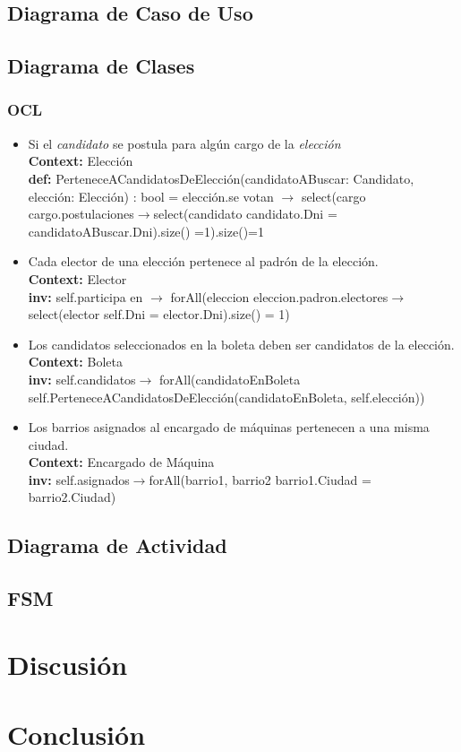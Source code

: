 \documentclass[spanish, 10pt,a4paper]{article}
\numberwithin{equation}{section} %
\begin{document}
\subsection{Diagrama de Caso de Uso}

\subsection{Diagrama de Clases}
\subsubsection{OCL}
\begin{itemize}
	\item Si el \textit{candidato} se postula para algún cargo de la \textit{elección}
\\	\textbf{Context: }  Elección
\\	\textbf{def: }PerteneceACandidatosDeElección(candidatoABuscar: Candidato, elección: Elección) : bool = elección.se votan $\rightarrow$ select(cargo \textbar cargo.postulaciones$\rightarrow$select(candidato \textbar candidato.Dni = candidatoABuscar.Dni).size() =1).size()=1

	\item Cada elector de una elección pertenece al padrón de la elección.
\\	\textbf{Context: }  Elector
\\	\textbf{inv: }self.participa en $\rightarrow$ forAll(eleccion \textbar eleccion.padron.electores$\rightarrow$select(elector \textbar self.Dni = elector.Dni).size() = 1)

	\item Los candidatos seleccionados en la boleta deben ser candidatos de la elección.
\\	\textbf{Context: }  Boleta
\\	\textbf{inv: }self.candidatos$\rightarrow$ forAll(candidatoEnBoleta \textbar self.PerteneceACandidatosDeElección(candidatoEnBoleta, self.elección))

	\item Los barrios asignados al encargado de máquinas pertenecen a una misma ciudad.
\\	\textbf{Context: }  Encargado de Máquina
\\	\textbf{inv: } self.asignados$\rightarrow$forAll(barrio1, barrio2 \textbar barrio1.Ciudad = barrio2.Ciudad)
\end{itemize}

\subsection{Diagrama de Actividad}

\subsection{FSM}

\section{Discusión}
	
\section{Conclusión}

\end{document}
